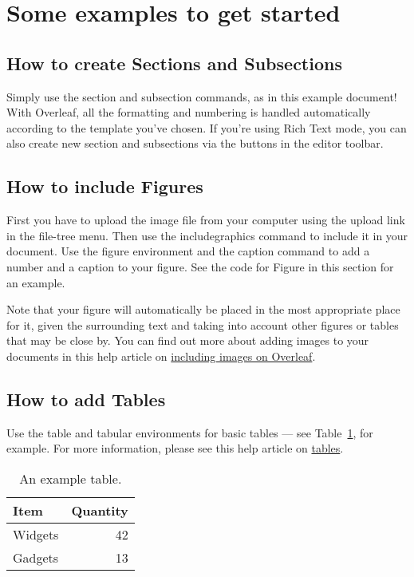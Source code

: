 \documentclass{article}
\begin{document}
\section{Some examples to get started}

\subsection{How to create Sections and Subsections}

Simply use the section and subsection commands, as in this example document! With Overleaf, all the formatting and numbering is handled automatically according to the template you've chosen. If you're using Rich Text mode, you can also create new section and subsections via the buttons in the editor toolbar.

\subsection{How to include Figures}

First you have to upload the image file from your computer using the upload link in the file-tree menu. Then use the includegraphics command to include it in your document. Use the figure environment and the caption command to add a number and a caption to your figure. See the code for Figure  in this section for an example.

Note that your figure will automatically be placed in the most appropriate place for it, given the surrounding text and taking into account other figures or tables that may be close by. You can find out more about adding images to your documents in this help article on \href{https://www.overleaf.com/learn/how-to/Including_images_on_Overleaf}{including images on Overleaf}.


\subsection{How to add Tables}

Use the table and tabular environments for basic tables --- see Table~\ref{tab:widgets}, for example. For more information, please see this help article on \href{https://www.overleaf.com/learn/latex/tables}{tables}. 

\begin{table}
\centering
\begin{tabular}{l|r}
Item & Quantity \\\hline
Widgets & 42 \\
Gadgets & 13
\end{tabular}
\caption{\label{tab:widgets}An example table.}
\end{table}
\end{document}
